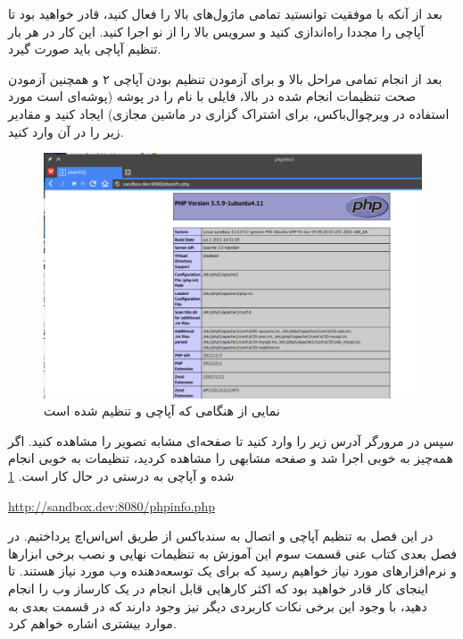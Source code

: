 بعد از آنکه با موفقیت توانستید تمامی ماژول‌های بالا را فعال کنید،  قادر خواهید بود تا آپاچی را مجددا راه‌اندازی کنید و سرویس بالا را از نو اجرا کنید. این کار در هر بار تنظیم آپاچی باید صورت گیرد.
\begin{latin}
    
    
\end{latin}
بعد از انجام تمامی مراحل بالا و برای آزمودن تنظیم بودن آپاچی ۲ و همچنین آزمودن صحت تنظیمات انجام شده در بالا، فایلی با نام 
 را در پوشه 
 (پوشه‌ای است مورد استفاده در ویرچوال‌باکس، برای اشتراک گزاری در ماشین مجازی) ایجاد کنید و مقادیر زیر را در آن وارد کنید.
\newline
\begin{latin}
    
\end{latin}

\begin{figure}
    \includegraphics[width=.9\textwidth ,height=.65\textwidth]{Pic/PHPINFO}
    \caption{ نمایی از 
        هنگامی که  آپاچی و 
         تنظیم شده است}
    \label{PHPINFO}
\end{figure}
سپس در مرورگر آدرس زیر را وارد کنید تا صفحه‌ای مشابه تصویر را مشاهده کنید. اگر همه‌چیز به خوبی اجرا شد و صفحه مشابهی را مشاهده کردید، تنظیمات به خوبی انجام شده و آپاچی به درستی در حال کار است. \ref{PHPINFO}
\begin{latin}
\url{http://sandbox.dev:8080/phpinfo.php}
\end{latin}
در این فصل به تنظیم آپاچی و اتصال به سندباکس از طریق اس‌اس‌اچ پرداختیم. در فصل  بعدی کتاب عنی قسمت سوم این آموزش به تنظیمات نهایی و نصب برخی ابزارها و نرم‌افزارهای مورد نیاز خواهیم رسید که برای یک توسعه‌دهنده وب مورد نیاز هستند. تا اینجای کار قادر خواهید بود  که اکثر کارهایی قابل انجام در یک کارساز وب را انجام دهید، با وجود این برخی نکات کاربردی دیگر نیز وجود دارند که در قسمت بعدی به موارد بیشتری اشاره خواهم کرد.